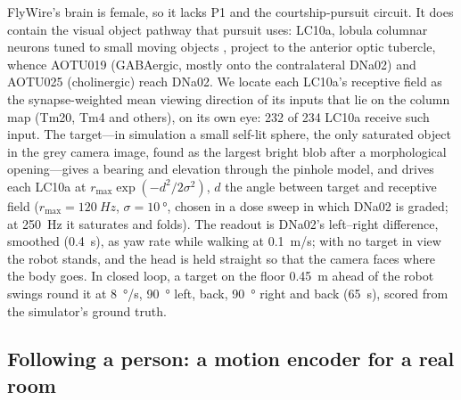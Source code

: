 \documentclass[10pt,a4paper]{article}
\begin{document}
FlyWire's brain is female, so it lacks P1 and the courtship-pursuit circuit. It does contain the visual
object pathway that pursuit uses: LC10a, lobula columnar neurons tuned to small moving objects
\cite{ribeiro2018,hindmarshsten2021}, project to the anterior optic tubercle, whence AOTU019 (GABAergic,
mostly onto the contralateral DNa02) and AOTU025 (cholinergic) reach DNa02. We locate each LC10a's
receptive field as the synapse-weighted mean viewing direction of its inputs that lie on the column map
(Tm20, Tm4 and others), on its own eye: 232 of 234 LC10a receive such input. The target---in simulation a
small self-lit sphere, the only saturated object in the grey camera image, found as the largest bright blob
after a morphological opening---gives a bearing and elevation through the pinhole model, and drives each
LC10a at $r_{\max}\exp(-d^2/2\sigma^2)$, $d$ the angle between target and receptive field
($r_{\max} = \SI{120}{Hz}$, $\sigma = \SI{10}{\degree}$, chosen in a dose sweep in which DNa02 is graded;
at \SI{250}{Hz} it saturates and folds). The readout is DNa02's left--right difference, smoothed
(\SI{0.4}{s}), as yaw rate while walking at \SI{0.1}{m/s}; with no target in view the robot stands, and the
head is held straight so that the camera faces where the body goes. In closed loop, a target on the floor
\SI{0.45}{m} ahead of the robot swings round it at \SI{8}{\degree/s}, \SI{90}{\degree} left, back,
\SI{90}{\degree} right and back (\SI{65}{s}), scored from the simulator's ground truth.

\subsection{Following a person: a motion encoder for a real room}
\end{document}
